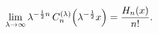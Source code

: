 \[\lim_{\lambda\to\infty}\lambda^{-\frac{1}{2}n}\mathop{C^{(\lambda)}_{n}\/}%
\nolimits\!\left(\lambda^{-\frac{1}{2}}x\right)=\frac{\mathop{H_{n}\/}%
\nolimits\!\left(x\right)}{n!}.\]